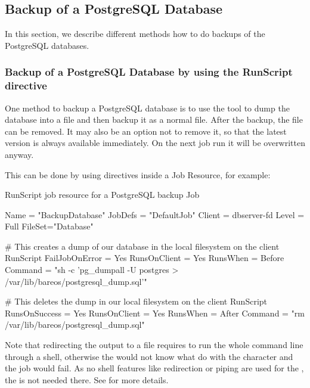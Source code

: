 \subsection{Backup of a PostgreSQL Database}
\label{backup-postgresql}

In this section, we describe different methods how to do backups of the PostgreSQL databases.


\subsubsection{Backup of a PostgreSQL Database by using the RunScript directive}

One method to backup a PostgreSQL database is to use the  tool to dump the database
into a file and then backup it as a normal file. After the backup, the file can be
removed. It may also be an option not to remove it, so that the latest version is
always available immediately. On the next job run it will be overwritten anyway.

This can be done by using  directives inside a
Job Resource, for example:

\begin{bconfig}{RunScript job resource for a PostgreSQL backup}
Job {
  Name = "BackupDatabase"
  JobDefs = "DefaultJob"
  Client = dbserver-fd
  Level = Full
  FileSet="Database"

  # This creates a dump of our database in the local filesystem on the client
  RunScript {
    FailJobOnError = Yes
    RunsOnClient = Yes
    RunsWhen = Before
    Command = "sh -c 'pg_dumpall -U postgres > /var/lib/bareos/postgresql_dump.sql'"
  }

  # This deletes the dump in our local filesystem on the client
  RunScript {
    RunsOnSuccess = Yes
    RunsOnClient = Yes
    RunsWhen = After
    Command = "rm /var/lib/bareos/postgresql_dump.sql"
  }
}
\end{bconfig}

Note that redirecting the  output to a file requires
to run the whole command line through a shell, otherwise the 
would not know what do with the \command{>} character and the job would fail.
As no shell features like redirection or piping are used for the ,
the  is not needed there.
See  for more details.

